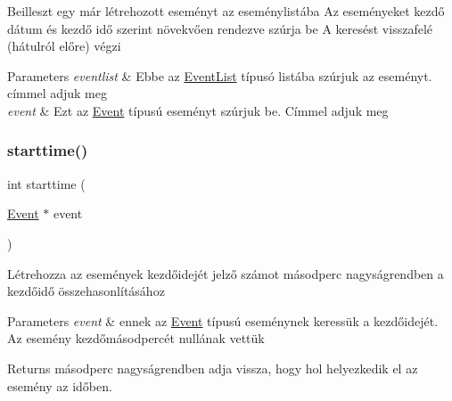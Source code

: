 Beilleszt egy már létrehozott eseményt az eseménylistába Az eseményeket kezdő dátum és kezdő idő szerint növekvően rendezve szúrja be A keresést visszafelé (hátulról előre) végzi 
\begin{DoxyParams}{Parameters}
{\em eventlist} & Ebbe az \hyperlink{struct_event_list}{Event\+List} típusó listába szúrjuk az eseményt. címmel adjuk meg \\
\hline
{\em event} & Ezt az \hyperlink{struct_event}{Event} típusú eseményt szúrjuk be. Címmel adjuk meg \\
\hline
\end{DoxyParams}
\mbox{\label{group__list_ga8f7708495c6e39bb6e712218711b331f}} 
\subsubsection{\texorpdfstring{starttime()}{starttime()}}
{\footnotesize\ttfamily int starttime (\begin{DoxyParamCaption}\item[{\hyperlink{struct_event}{Event} $\ast$}]{event }\end{DoxyParamCaption})}

Létrehozza az események kezdőidejét jelző számot másodperc nagyságrendben a kezdőidő összehasonlításához 
\begin{DoxyParams}{Parameters}
{\em event} & ennek az \hyperlink{struct_event}{Event} típusú eseménynek keressük a kezdőidejét. Az esemény kezdőmásodpercét nullának vettük \\
\hline
\end{DoxyParams}
\begin{DoxyReturn}{Returns}
másodperc nagyságrendben adja vissza, hogy hol helyezkedik el az esemény az időben. 
\end{DoxyReturn}
